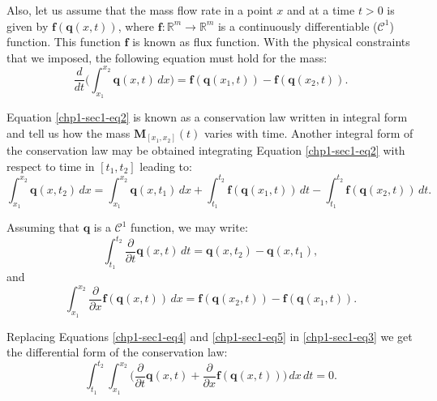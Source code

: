 Also, let us assume that the mass flow rate in a point $x$ and at a time 
$t > 0$ is given by $\mathbf{f}(\mathbf{q}(x,t))$, where $\mathbf{f}:\mathbb{R}^m \to \mathbb{R}^m$ is 
a continuously differentiable ($\mathcal{C}^1$) function. This function $\mathbf{f}$ is known as flux function.
With the physical constraints that we imposed, the following equation must hold for the mass:
\begin{equation}
	\label{chp1-sec1-eq2}
	\frac{d}{dt} \bigg( \int_{x_1}^{x_2} \mathbf{q}(x,t) \,dx \bigg) = 
	\mathbf{f}(\mathbf{q}(x_1,t)) - \mathbf{f}(\mathbf{q}(x_2,t)) .
\end{equation}

Equation \eqref{chp1-sec1-eq2} is known as a conservation law written in integral form and tell us how the mass 
$\mathbf{M}_{[x_1, x_2]}(t)$ varies with time. Another integral form of the conservation law may be obtained integrating
Equation \eqref{chp1-sec1-eq2} with respect to time in $[t_1, t_2]$ leading to: 
\begin{equation}
	\label{chp1-sec1-eq3}
	\int_{x_1}^{x_2} \mathbf{q}(x, t_2) \,dx = 
	\int_{x_1}^{x_2} \mathbf{q}(x, t_1) \,dx + 
	\int_{t_1}^{t_2} \mathbf{f}(\mathbf{q}(x_1, t)) \,dt -
	\int_{t_1}^{t_2}\mathbf{f}(\mathbf{q}(x_2, t)) \,dt .
\end{equation}

Assuming that $\mathbf{q}$ is a $\mathcal{C}^1$ function, we may write:
\begin{equation}
	\label{chp1-sec1-eq4}
	\int_{t_1}^{t_2} 
	\frac{\partial}{\partial t} \mathbf{q}(x,t) \,dt
	= \mathbf{q}(x, t_2) - \mathbf{q}(x, t_1) ,
\end{equation}
and
\begin{equation}
	\label{chp1-sec1-eq5}
	\int_{x_1}^{x_2} \frac{\partial}{\partial x}\mathbf{f}(\mathbf{q}(x,t)) \,dx 
	= \mathbf{f}(\mathbf{q}(x_2, t)) -
	\mathbf{f}( \mathbf{q}(x_1, t)) .
\end{equation}

Replacing Equations \eqref{chp1-sec1-eq4} and \eqref{chp1-sec1-eq5}
in \eqref{chp1-sec1-eq3} we get the differential form of the conservation law:
\begin{equation}
	\label{chp1-sec1-eq6}
	\int_{t_1}^{t_2} \int_{x_1}^{x_2} 
	\bigg( \frac{\partial}{\partial t}\mathbf{q}(x, t) 
	+ \frac{\partial}{\partial x} \mathbf{f}(\mathbf{q}(x, t)) \bigg) 
	\,dx \,dt  = 0.
\end{equation}

